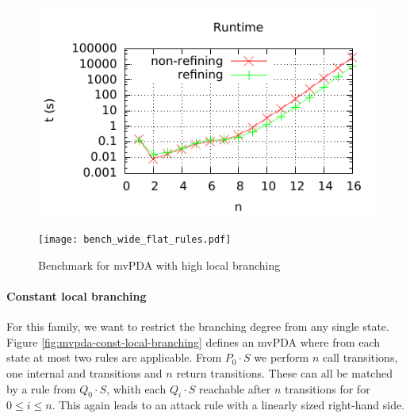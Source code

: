 \begin{figure}[ht]
\centering
  \begin{minipage}[b]{.45\textwidth}
    \includegraphics{./graphs/bench_wide_flat_time.pdf}
  \end{minipage}
  \hspace{0.5cm}
  \begin{minipage}[b]{.45\textwidth}
    \texttt{[image: bench\_wide\_flat\_rules.pdf]}
  \end{minipage}
  \caption{Benchmark for mvPDA with high local branching}
  \label{fig:bench-high-local-branching}
\end{figure}

\paragraph{Constant local branching}

For this family,
we want to restrict the branching degree from any single state.
Figure \ref{fig:mvpda-const-local-branching} defines an mvPDA where from
each state at most two rules are applicable.
From $P_0⋅S$ we perform $n$ call transitions, one internal and transitions
and $n$ return transitions.
These can all be matched by a rule from $Q_0⋅S$, whith each $Q_i⋅S$
reachable after $n$ transitions for for $0 ≤ i ≤ n$.
This again leads to an attack rule with a linearly sized right-hand side.

